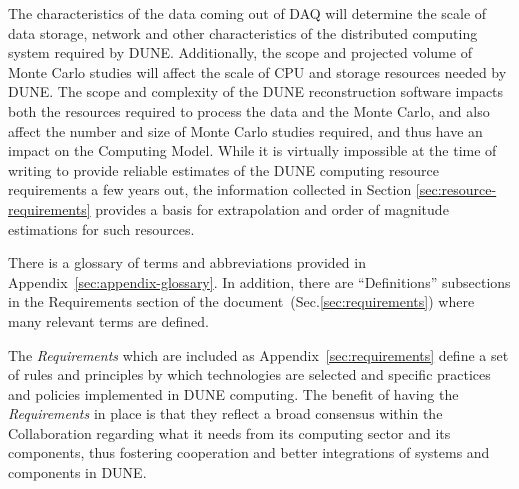 The characteristics of the data coming out of DAQ will determine the scale of data storage, network
and other characteristics of the distributed computing system required by DUNE.  Additionally, the scope and projected
volume of Monte Carlo studies  will affect the scale of CPU and storage resources needed by DUNE.  The scope and complexity of the DUNE
reconstruction software impacts both the resources required to process the data and the Monte Carlo, and also affect the
number and size of Monte Carlo studies required, and thus have an impact on the Computing Model. While it is virtually
impossible at the time of writing to provide reliable estimates of the DUNE computing resource requirements a few years out,
the information collected in Section \ref{sec:resource-requirements} provides a basis for extrapolation and order of magnitude
estimations for such resources.

There is a glossary of terms and abbreviations provided in Appendix~\ref{sec:appendix-glossary}. In addition,
there are ``Definitions'' subsections in the Requirements section of the document~(Sec.\ref{sec:requirements}) where
many relevant terms are defined.

The \textit{Requirements} which are included as Appendix~\ref{sec:requirements}
define a set of rules and principles by which technologies are selected and specific practices and policies implemented in DUNE computing.
The benefit of having the \textit{Requirements} in place is that they reflect a broad consensus within the Collaboration regarding what it needs from
its computing sector and its components, thus fostering cooperation and better integrations of systems and components in DUNE.

